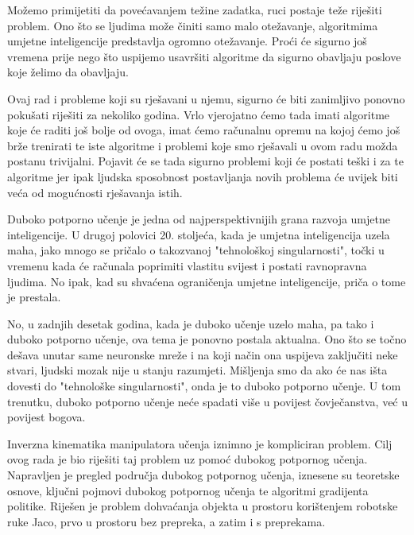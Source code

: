\documentclass[times,utf8,diplomski]{fer}
\begin{document}
Možemo primijetiti da povećavanjem težine zadatka, ruci postaje teže riješiti problem. Ono što se ljudima može činiti samo malo otežavanje, algoritmima umjetne inteligencije predstavlja ogromno otežavanje. Proći će sigurno još vremena prije nego što uspijemo usavršiti algoritme da sigurno obavljaju poslove koje želimo da obavljaju. 

Ovaj rad i probleme koji su rješavani u njemu, sigurno će biti zanimljivo ponovno pokušati riješiti za nekoliko godina. Vrlo vjerojatno ćemo tada imati algoritme koje će raditi još bolje od ovoga, imat ćemo računalnu opremu na kojoj ćemo još brže trenirati te iste algoritme i problemi koje smo rješavali u ovom radu možda postanu trivijalni. Pojavit će se tada sigurno problemi koji će postati teški i za te algoritme jer ipak ljudska sposobnost postavljanja novih problema će uvijek biti veća od mogućnosti rješavanja istih.

Duboko potporno učenje je jedna od najperspektivnijih grana razvoja umjetne inteligencije. U drugoj polovici 20. stoljeća, kada je umjetna inteligencija uzela maha, jako mnogo se pričalo o takozvanoj "tehnološkoj singularnosti", točki u vremenu kada će računala poprimiti vlastitu svijest i postati ravnopravna ljudima. No ipak, kad su shvaćena ograničenja umjetne inteligencije, priča o tome je prestala.

No, u zadnjih desetak godina, kada je duboko učenje uzelo maha, pa tako i duboko potporno učenje, ova tema je ponovno postala aktualna. Ono što se točno dešava unutar same neuronske mreže i na koji način ona uspijeva zaključiti neke stvari, ljudski mozak nije u stanju razumjeti. Mišljenja smo da ako će nas išta dovesti do "tehnološke singularnosti", onda je to duboko potporno učenje. U tom trenutku, duboko potporno učenje neće spadati više u povijest čovječanstva, već u povijest bogova.







\begin{sazetak}

	Inverzna kinematika manipulatora učenja iznimno je kompliciran problem. Cilj ovog rada je bio riješiti taj problem uz pomoć dubokog potpornog učenja. Napravljen je pregled područja dubokog potpornog učenja, iznesene su teoretske osnove, ključni pojmovi dubokog potpornog učenja te algoritmi gradijenta politike. Riješen je problem dohvaćanja objekta u prostoru korištenjem robotske ruke Jaco, prvo u prostoru bez prepreka, a zatim i s preprekama.

\end{sazetak}
\end{document}
